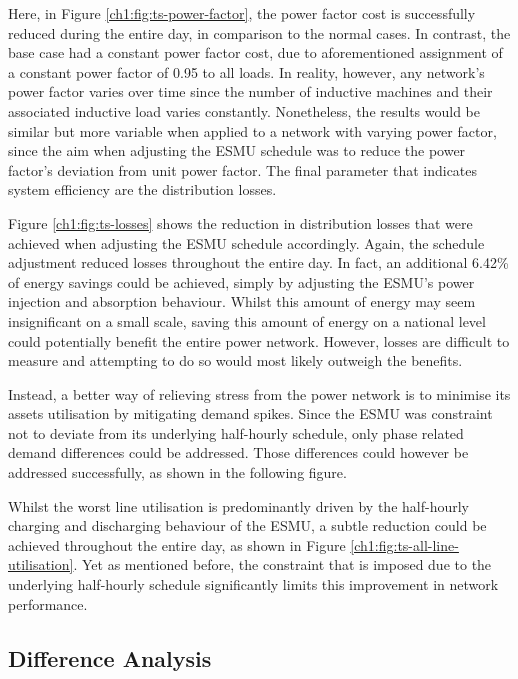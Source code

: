 

Here, in Figure \ref{ch1:fig:ts-power-factor}, the power factor cost is successfully reduced during the entire day, in comparison to the normal cases.
In contrast, the base case had a constant power factor cost, due to aforementioned assignment of a constant power factor of 0.95 to all loads.
In reality, however, any network's power factor varies over time since the number of inductive machines and their associated inductive load varies constantly.
Nonetheless, the results would be similar but more variable when applied to a network with varying power factor, since the aim when adjusting the ESMU schedule was to reduce the power factor's deviation from unit power factor.
The final parameter that indicates system efficiency are the distribution losses.



Figure \ref{ch1:fig:ts-losses} shows the reduction in distribution losses that were achieved when adjusting the ESMU schedule accordingly.
Again, the schedule adjustment reduced losses throughout the entire day.
In fact, an additional 6.42\% of energy savings could be achieved, simply by adjusting the ESMU's power injection and absorption behaviour.
Whilst this amount of energy may seem insignificant on a small scale, saving this amount of energy on a national level could potentially benefit the entire power network.
However, losses are difficult to measure and attempting to do so would most likely outweigh the benefits.

Instead, a better way of relieving stress from the power network is to minimise its assets utilisation by mitigating demand spikes.
Since the ESMU was constraint not to deviate from its underlying half-hourly schedule, only phase related demand differences could be addressed.
Those differences could however be addressed successfully, as shown in the following figure.



Whilst the worst line utilisation is predominantly driven by the half-hourly charging and discharging behaviour of the ESMU, a subtle reduction could be achieved throughout the entire day, as shown in Figure \ref{ch1:fig:ts-all-line-utilisation}.
Yet as mentioned before, the constraint that is imposed due to the underlying half-hourly schedule significantly limits this improvement in network performance.

\subsection{Difference Analysis}
\label{ch1:subsec:difference-analysis}

